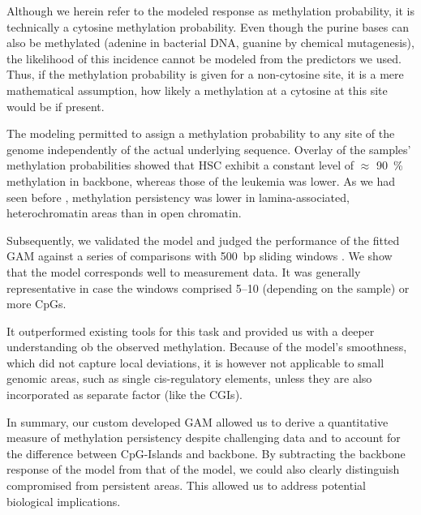 Although we herein refer to the modeled response as methylation probability, it is technically a cytosine methylation probability. Even though the purine bases can also be methylated (adenine in bacterial DNA, guanine by chemical mutagenesis), the likelihood of this incidence cannot be modeled from the predictors we used. Thus, if the methylation probability is given for a non-cytosine site, it is a mere mathematical assumption, how likely a methylation at a cytosine at this site would be if present. 

The modeling permitted to assign a methylation probability to any site of the genome independently of the actual underlying sequence. Overlay of the samples' methylation probabilities showed that \dnmtwt HSC exhibit a constant level of $\approx$ \SI{90}{\percent} methylation in backbone, whereas those of the leukemia was lower. As we had seen before , methylation persistency was lower in lamina-associated, heterochromatin areas than in open chromatin.

Subsequently, we validated the model and judged the performance of the fitted GAM against a series of comparisons with \SI{500}{bp} sliding windows \supple. We show that the model corresponds well to measurement data. It was generally representative in case the windows comprised \numrange{5}{10} (depending on the sample) or more CpGs\supple.

It outperformed existing tools for this task and provided us with a deeper understanding ob the observed methylation. Because of the model's smoothness, which did not capture local deviations,  it is however not applicable to small genomic areas, such as single cis-regulatory elements, unless they are also incorporated as separate factor (like the CGIs). 

In summary, our custom developed GAM allowed us to derive a quantitative measure of methylation persistency despite challenging data and to account for the difference between CpG-Islands and backbone. By subtracting the backbone response of the \dnmtchip model from that of the \dnmtwt model, we could also clearly distinguish compromised from persistent areas. This allowed us to address potential biological implications. 

